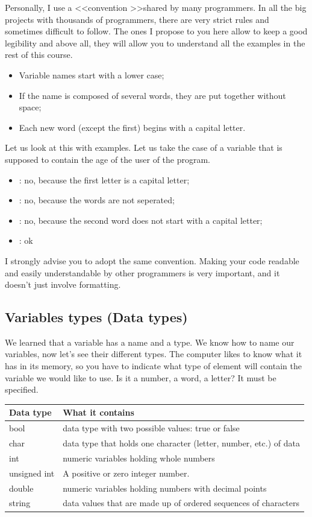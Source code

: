 \documentclass[11pt, a4paper]{article}
\begin{document}
Personally, I use a \textless\textless convention \textgreater\textgreater shared by many programmers.
In all the big projects with thousands of programmers, there are very strict rules and sometimes difficult
to follow. The ones I propose to you here allow to keep a good legibility and above
all, they will allow you to understand all the examples in the rest of this course.
\begin{itemize}
\item Variable names start with a lower case;
\item If the name is composed of several words, they are put together without space;
\item Each new word (except the first) begins with a capital letter.
\end{itemize}

Let us look at this with examples. Let us take the case of a variable that is supposed
to contain the age of the user of the program.

\begin{itemize}
    \item {}: no, because the first letter is a capital letter;
    \item {}: no, because the words are not seperated;
    \item {}: no, because the second word does not start with a capital letter;
    \item {}: ok
\end{itemize}

I strongly advise you to adopt the same convention. Making your code readable and easily
understandable by other programmers is very important, and it doesn’t just involve formatting.

\subsection{Variables types (Data types)}
We learned that a variable has a name and a type. We know how to name our variables, now let’s
see their different types. The computer likes to know what it has in its memory, so you have
to indicate what type of element will contain the variable we would like to use. Is it a number,
a word, a letter? It must be specified.\\

\begin{tabular}{ |p{3cm}||p{10cm}| }
    \hline
    \textbf{Data type} & \textbf{What it contains} \\
    \hline
    bool  & data type with two possible values: true or false    \\
    char&   data type that holds one character (letter, number, etc.) of data  \\
    int &numeric variables holding whole numbers \\
    unsigned int    &A positive or zero integer number.\\
    double&   numeric variables holding numbers with decimal points  \\
    string& data values that are made up of ordered sequences of characters\\
    \hline
\end{tabular}
\end{document}

